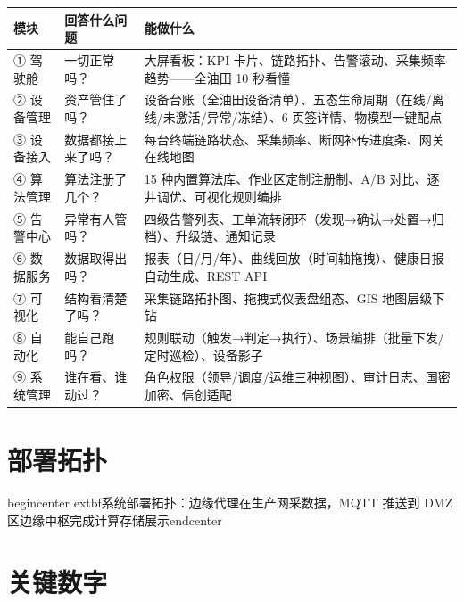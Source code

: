 \documentclass[11pt,a4paper]{ctexart}
\begin{document}
\begin{table}[H]\centering
\begin{tabular}{p{2.4cm} p{3.2cm} p{7.6cm}}
\toprule
\textbf{模块} & \textbf{回答什么问题} & \textbf{能做什么} \\
\midrule
① 驾驶舱 & 一切正常吗？ & 大屏看板：KPI 卡片、链路拓扑、告警滚动、采集频率趋势——全油田 10 秒看懂 \\
② 设备管理 & 资产管住了吗？ & 设备台账（全油田设备清单）、五态生命周期（在线/离线/未激活/异常/冻结）、6 页签详情、物模型一键配点 \\
③ 设备接入 & 数据都接上来了吗？ & 每台终端链路状态、采集频率、断网补传进度条、网关在线地图 \\
④ 算法管理 & 算法注册了几个？ & 15 种内置算法库、作业区定制注册制、A/B 对比、逐井调优、可视化规则编排 \\
⑤ 告警中心 & 异常有人管吗？ & 四级告警列表、工单流转闭环（发现→确认→处置→归档）、升级链、通知记录 \\
⑥ 数据服务 & 数据取得出吗？ & 报表（日/月/年）、曲线回放（时间轴拖拽）、健康日报自动生成、REST API \\
⑦ 可视化 & 结构看清楚了吗？ & 采集链路拓扑图、拖拽式仪表盘组态、GIS 地图层级下钻 \\
⑧ 自动化 & 能自己跑吗？ & 规则联动（触发→判定→执行）、场景编排（批量下发/定时巡检）、设备影子 \\
⑨ 系统管理 & 谁在看、谁动过？ & 角色权限（领导/调度/运维三种视图）、审计日志、国密加密、信创适配 \\
\bottomrule
\end{tabular}
\end{table}

\section{部署拓扑}

begin{center}	extbf{系统部署拓扑：边缘代理在生产网采数据，MQTT 推送到 DMZ 区边缘中枢完成计算存储展示}end{center}



\section{关键数字}
\end{document}
